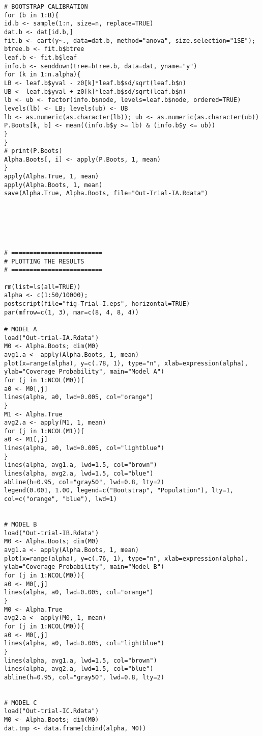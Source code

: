 \begin{enumerate}[A]
\begin{verbatim}
# BOOTSTRAP CALIBRATION
for (b in 1:B){
id.b <- sample(1:n, size=n, replace=TRUE) 
dat.b <- dat[id.b,]
fit.b <- cart(y~., data=dat.b, method="anova", size.selection="1SE");
btree.b <- fit.b$btree 
leaf.b <- fit.b$leaf	
info.b <- senddown(tree=btree.b, data=dat, yname="y")
for (k in 1:n.alpha){
LB <- leaf.b$yval - z0[k]*leaf.b$sd/sqrt(leaf.b$n)
UB <- leaf.b$yval + z0[k]*leaf.b$sd/sqrt(leaf.b$n)
lb <- ub <- factor(info.b$node, levels=leaf.b$node, ordered=TRUE)
levels(lb) <- LB; levels(ub) <- UB
lb <- as.numeric(as.character(lb)); ub <- as.numeric(as.character(ub))
P.Boots[k, b] <- mean((info.b$y >= lb) & (info.b$y <= ub)) 
}
}
# print(P.Boots)
Alpha.Boots[, i] <- apply(P.Boots, 1, mean)
}
apply(Alpha.True, 1, mean)
apply(Alpha.Boots, 1, mean)
save(Alpha.True, Alpha.Boots, file="Out-Trial-IA.Rdata")






# =========================
# PLOTTING THE RESULTS
# =========================

rm(list=ls(all=TRUE))
alpha <- c(1:50/10000); 
postscript(file="fig-Trial-I.eps", horizontal=TRUE)
par(mfrow=c(1, 3), mar=c(8, 4, 8, 4))

# MODEL A
load("Out-trial-IA.Rdata")
M0 <- Alpha.Boots; dim(M0)
avg1.a <- apply(Alpha.Boots, 1, mean)
plot(x=range(alpha), y=c(.78, 1), type="n", xlab=expression(alpha),
ylab="Coverage Probability", main="Model A")
for (j in 1:NCOL(M0)){
a0 <- M0[,j]
lines(alpha, a0, lwd=0.005, col="orange") 
}
M1 <- Alpha.True
avg2.a <- apply(M1, 1, mean)
for (j in 1:NCOL(M1)){
a0 <- M1[,j]
lines(alpha, a0, lwd=0.005, col="lightblue") 
}
lines(alpha, avg1.a, lwd=1.5, col="brown")
lines(alpha, avg2.a, lwd=1.5, col="blue")
abline(h=0.95, col="gray50", lwd=0.8, lty=2)
legend(0.001, 1.00, legend=c("Bootstrap", "Population"), lty=1, 
col=c("orange", "blue"), lwd=1)


# MODEL B
load("Out-trial-IB.Rdata")
M0 <- Alpha.Boots; dim(M0)
avg1.a <- apply(Alpha.Boots, 1, mean)
plot(x=range(alpha), y=c(.76, 1), type="n", xlab=expression(alpha),
ylab="Coverage Probability", main="Model B")
for (j in 1:NCOL(M0)){
a0 <- M0[,j]
lines(alpha, a0, lwd=0.005, col="orange") 
}
M0 <- Alpha.True
avg2.a <- apply(M0, 1, mean)
for (j in 1:NCOL(M0)){
a0 <- M0[,j]
lines(alpha, a0, lwd=0.005, col="lightblue") 
}
lines(alpha, avg1.a, lwd=1.5, col="brown")
lines(alpha, avg2.a, lwd=1.5, col="blue")
abline(h=0.95, col="gray50", lwd=0.8, lty=2)


# MODEL C
load("Out-trial-IC.Rdata")
M0 <- Alpha.Boots; dim(M0)
dat.tmp <- data.frame(cbind(alpha, M0))


\end{verbatim}
\end{enumerate}
